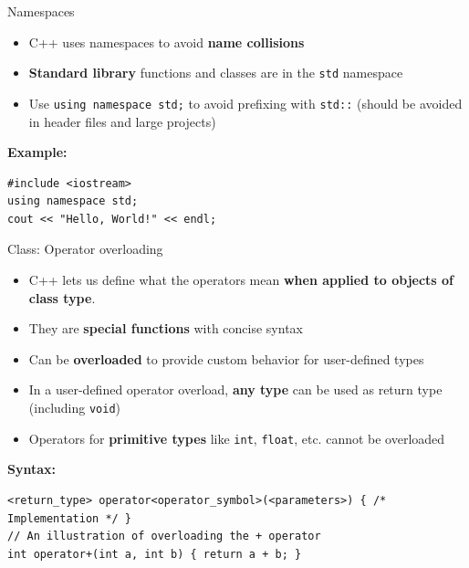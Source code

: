 \begin{frame}[fragile]{Namespaces}
	\begin{itemize}
		\item C++ uses namespaces to avoid \textbf{name collisions}
		\item \textbf{Standard library} functions and classes are in the \texttt{std} namespace
		\item Use \texttt{using namespace std;} to avoid prefixing with \texttt{std::} (should be avoided in header files and large projects)
	\end{itemize}
	\textbf{Example:}
	\begin{verbatim}
#include <iostream>
using namespace std;
cout << "Hello, World!" << endl;
        \end{verbatim}
\end{frame}

\begin{frame}[fragile]{Class: Operator overloading}
	\begin{itemize}
        \item C++ lets us define what the operators mean \textbf{when applied to objects of class type}.
		\item They are \textbf{special functions} with concise syntax
		\item Can be \textbf{overloaded} to provide custom behavior for user-defined types
        \item In a user-defined operator overload, \textbf{any type} can be used as return type (including \texttt{void})
		\item Operators for \textbf{primitive types} like \texttt{int}, \texttt{float}, etc. cannot be overloaded
	\end{itemize}

	\textbf{Syntax:}
	\begin{verbatim}
<return_type> operator<operator_symbol>(<parameters>) { /* Implementation */ }
// An illustration of overloading the + operator
int operator+(int a, int b) { return a + b; }
    \end{verbatim}
\end{frame}


